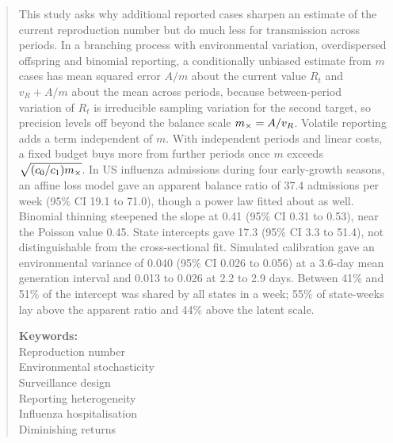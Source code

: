 \begin{abstract}
\noindent This study asks why additional reported cases sharpen an estimate of the current reproduction number but do much less for transmission across periods. In a branching process with environmental variation, overdispersed offspring and binomial reporting, a conditionally unbiased estimate from $m$ cases has mean squared error $A/m$ about the current value $R_t$ and $v_R+A/m$ about the mean across periods, because between-period variation of $R_t$ is irreducible sampling variation for the second target, so precision levels off beyond the balance scale $\mx=A/v_R$. Volatile reporting adds a term independent of $m$. With independent periods and linear costs, a fixed budget buys more from further periods once $m$ exceeds $\sqrt{(c_0/c_1)\mx}$. In US influenza admissions during four early-growth seasons, an affine loss model gave an apparent balance ratio of 37.4 admissions per week (95\% CI 19.1 to 71.0), though a power law fitted about as well. Binomial thinning steepened the slope at 0.41 (95\% CI 0.31 to 0.53), near the Poisson value 0.45. State intercepts gave 17.3 (95\% CI 3.3 to 51.4), not distinguishable from the cross-sectional fit. Simulated calibration gave an environmental variance of 0.040 (95\% CI 0.026 to 0.056) at a 3.6-day mean generation interval and 0.013 to 0.026 at 2.2 to 2.9 days. Between 41\% and 51\% of the intercept was shared by all states in a week; 55\% of state-weeks lay above the apparent ratio and 44\% above the latent scale.

\medskip
\noindent\textbf{Keywords:}\\
Reproduction number\\
Environmental stochasticity\\
Surveillance design\\
Reporting heterogeneity\\
Influenza hospitalisation\\
Diminishing returns
\end{abstract}
